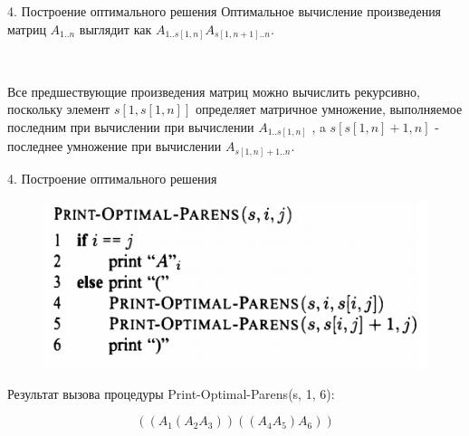 \documentclass{beamer}
\begin{document}
\begin{frame}[t]{4. Построение оптимального решения}
    Оптимальное вычисление произведения матриц $A_{1..n}$ выглядит как 
$A_{1..s[1,n]} A_{s[1,n+1]..n}$.

    ~
    
    Все предшествующие произведения матриц можно вычислить рекурсивно, поскольку элемент $s[1,s[1,n]]$ определяет матричное умножение, выполняемое последним при вычислении при вычислении $A_{1..s[1,n]}$ , a
    $s[s[1,n]+1, n]$ - последнее умножение при вычислении $A_{s[1,n]+1..n}$.
\end{frame}

\begin{frame}[t]{4. Построение оптимального решения}
    \begin{figure}[h]
		\centering
		\includegraphics[scale=0.75]{images/lec09-pic18.png}
	\end{figure} 
	
	Результат вызова процедуры Print-Optimal-Parens(s, 1, 6):
	
	\[((A_1(A_2A_3))((A_4A_5)A_6))\]
\end{frame}
\end{document}
